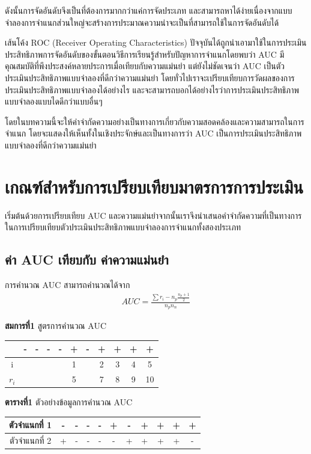 \documentclass[twoside, twocolumn, 12pt]{article}
\begin{document}
ดังนั้นการจัดอันดับจึงเป็นที่ต้องการมากกว่าแค่การจัดประเภท และสามารถหาได้ง่ายเนื่องจากแบบจำลองการจำแนกส่วนใหญ่จะสร้างการประมาณความน่าจะเป็นที่สามารถใช้ในการจัดอันดับได้

เส้นโค้ง ROC (Receiver Operating Characteristics) ปัจจุบันได้ถูกนำเอามาใช้ในการประเมินประสิทธิภาพการจัดอันดับของขั้นตอนวิธีการเรียนรู้สำหรับปัญหาการจำแนกโดยพบว่า AUC มีคุณสมบัติที่พึงประสงค์หลายประการเมื่อเทียบกับความแม่นยำ แต่ยังไม่ชัดเจนว่า AUC เป็นตัวประเมินประสิทธิภาพแบบจำลองที่ดีกว่าความแม่นยำ โดยทั่วไปเราจะเปรียบเทียบการวัดผลของการประเมินประสิทธิภาพแบบจำลองได้อย่างไร และจะสามารถบอกได้อย่างไรว่าการประเมินประสิทธิภาพแบบจำลองแบบไดดีกว่าแบบอื่นๆ 

โดยในบทความนี้จะให้คำจำกัดความอย่างเป็นทางการเกี่ยวกับความสอดคล้องและความสามารถในการจำแนก โดยจะแสดงให้เห็นทั้งในเชิงประจักษ์และเป็นทางการว่า AUC เป็นการประเมินประสิทธิภาพแบบจำลองที่ดีกว่าความแม่นยำ

\section{เกณฑ์สำหรับการเปรียบเทียบมาตรการการประเมิน}
\quad เริ่มต้นด้วยการเปรียบเทียบ AUC และความแม่นยำจากนั้นเราจึงนำเสนอคำจำกัดความที่เป็นทางการในการเปรียบเทียบตัวประเมินประสิทธิภาพแบบจำลองการจำแนกทั้งสองประเภท
\subsection{ค่า AUC เทียบกับ ค่าความแม่นยำ}
\quad การคำนวณ AUC สามารถคำนวณได้จาก
\begin{gather*}
AUC = \frac{\sum r_i-n_p\frac{n_p + 1}{2}}{n_pn_n}
\end{gather*}

\begin{center} \textbf{สมการที่1} สูตรการคำนวณ AUC \end{center}
\begin{center}
\begin{tabular}{ccccccccccc}
  &-&-&-&-&+&-&+&+&+&+ \\
  \hline
  i&&&&&1&&2&3&4&5 \\
  $r_i$& & & & & 5&&7&8&9&10\\
  \hline  
\end{tabular}
\end{center}
\begin{center} \textbf{ตารางที่1} ตัวอย่างข้อมูลการคำนวณ AUC \end{center}
\begin{center}
\begin{tabular}{c|ccccc|ccccc}
  \hline
  ตัวจำแนกที่ 1 &-& -& -& -& +& -& +& +& +& +\\
  \hline
  ตัวจำแนกที่ 2 & +& -& -& -& -& +& +& +& +& -\\
  \hline  
\end{tabular}
\end{center}
\end{document}
